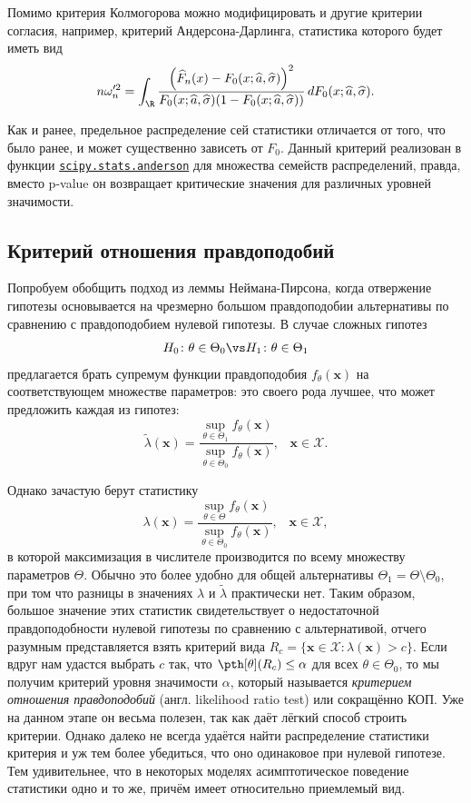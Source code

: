 Помимо критерия Колмогорова можно модифицировать и другие критерии согласия, например, критерий Андерсона-Дарлинга, статистика которого будет иметь вид
\[
n\omega'^2_n = \int_{\R} \frac{\left(\widehat{F}_n(x) - F_0(x;\widehat{a}, \widehat{\sigma})\right)^2}{F_0(x;\widehat{a}, \widehat{\sigma})(1-F_0(x;\widehat{a}, \widehat{\sigma}))} \, dF_0(x;\widehat{a}, \widehat{\sigma}).
\]

Как и ранее, предельное распределение сей статистики отличается от того, что было ранее, и может существенно зависеть от $F_0$. Данный критерий реализован в функции \href{https://docs.scipy.org/doc/scipy/reference/generated/scipy.stats.anderson.html#scipy.stats.anderson}{\texttt{scipy.stats.anderson}} для множества семейств распределений, правда, вместо p-value он возвращает критические значения для различных уровней значимости.

\subsection{Критерий отношения правдоподобий}

Попробуем обобщить подход из леммы Неймана-Пирсона, когда отвержение гипотезы основывается на чрезмерно большом правдоподобии альтернативы по сравнению с правдоподобием нулевой гипотезы. В случае сложных гипотез
$$H_0\colon \theta \in \Theta_0 \vs H_1\colon \theta \in \Theta_1$$
предлагается брать супремум функции правдоподобия $f_{\theta}(\mathbf x)$ на соответствующем множестве параметров: это своего рода лучшее, что может предложить каждая из гипотез:
\[
	\widetilde\lambda(\mathbf x) = \frac{\sup\limits_{\theta \in \Theta_1} f_{\theta}(\mathbf x)}{\sup\limits_{\theta \in \Theta_0} f_{\theta}(\mathbf x)}, \;\;\; \mathbf x \in \mathcal{X}.
\]

Однако зачастую берут статистику 
\begin{equation}\label{lrt_stat}
	\lambda(\mathbf x) = \frac{\sup\limits_{\theta \in \Theta} f_{\theta}(\mathbf x)}{\sup\limits_{\theta \in \Theta_0} f_{\theta}(\mathbf x)}, \;\;\; \mathbf x \in \mathcal{X},
\end{equation}
в которой максимизация в числителе производится по всему множеству параметров $\Theta$. Обычно это более удобно для общей альтернативы $\Theta_1 = \Theta \setminus \Theta_0$, при том что разницы в значениях $\lambda$ и $\widetilde\lambda$ практически нет. Таким образом, большое значение этих статистик свидетельствует о недостаточной правдоподобности нулевой гипотезы по сравнению с альтернативой, отчего разумным представляется взять критерий вида $R_{c} = \{\mathbf x \in \mathcal{X}\colon \lambda(\mathbf x) > c\}$. Если вдруг нам удастся выбрать $c$ так, что $\pth[\theta](R_c) \le \alpha$ для всех $\theta \in \Theta_0$, то мы получим критерий уровня значимости $\alpha$, который называется \textit{критерием отношения правдоподобий} (англ. \textsf{likelihood ratio test}) или сокращённо КОП. Уже на данном этапе он весьма полезен, так как даёт лёгкий способ строить критерии. Однако далеко не всегда удаётся найти распределение статистики критерия и уж тем более убедиться, что оно одинаковое при нулевой гипотезе. Тем удивительнее, что в некоторых моделях асимптотическое поведение статистики одно и то же, причём имеет относительно приемлемый вид.

